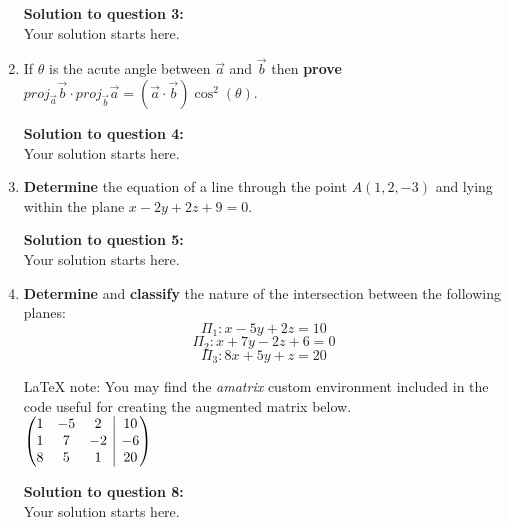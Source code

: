 \documentclass[12pt]{book}
\makeatletter
\newenvironment{amatrix}[1]{%
  \left(\begin{array}{@{}*{#1}{c}|c@{}}
}{%
  \end{array}\right)
}
\makeatother
\begin{document}
\begin{enumerate}
\vspace{0.3cm} 
\textbf{Solution to question 3:}\\
 Your solution starts here.
\vspace{0.3cm}


\newpage

\item If $\theta$ is the acute angle between $\vec{a}$ and $\vec{b}$ then \textbf{prove} $proj_{\vec{a}}\vec{b} \cdot proj_{\vec{b}}\vec{a} = (\vec{a} \cdot \vec{b}) \cos^2(\theta)$.

\vspace{0.3cm} 
\textbf{Solution to question 4:}\\
 Your solution starts here.
\vspace{0.3cm}

\newpage

\item \textbf{Determine} the equation of a line through the point $A(1,2,-3)$ and lying within the plane $x-2y+2z+9=0$.

\vspace{0.3cm} 
\textbf{Solution to question 5:}\\
 Your solution starts here.
\vspace{0.3cm}

\newpage

\item \textbf{Determine} and \textbf{classify} the nature of the intersection between the following planes:
$$\Pi_1: x-5y+2z=10 $$
$$\Pi_2: x+7y-2z+6=0 $$
$$\Pi_3: 8x+5y+z=20 $$


\LaTeX{} note: You may find the \emph{amatrix} custom environment included in the code useful for creating the augmented matrix below.\\

$
\begin{amatrix}{3}
   1 & -5 & 2 & 10\\  1 & 7 & -2  & -6\\ 8 & 5 & 1 & 20 
 \end{amatrix}
$

\vspace{0.3cm} 
\textbf{Solution to question 8:}\\
 Your solution starts here.
\vspace{0.3cm}


\newpage



\end{enumerate}
\end{document}
